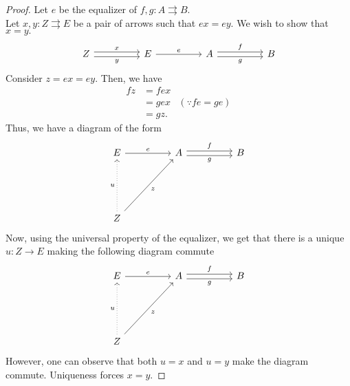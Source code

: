 \documentclass[11pt,leqno,landscape,semhelv]{seminar}
\theoremstyle{definition}
\numberwithin{joke}{section}
\numberwithin{thm}{section}
\numberwithin{equation}{section}
\newcommand{\tto}{\rightrightarrows}
\begin{document}
\begin{proof} 
  Let $e$ be the equalizer of $f, g:A\tto B.$\\
  Let $x, y:Z \tto E$ be a pair of arrows such that $ex = ey.$ We wish to show that $x = y.$
  \begin{equation*} 
    \begin{tikzcd}
      Z \arrow[rr, "x", shift left]\arrow[rr, "y"', shift right] &&
      E \arrow[rr, "e"] &&
      A \arrow[rr, "f", shift left]\arrow[rr, "g"', shift right] && B
    \end{tikzcd}
  \end{equation*}
  Consider $z = ex = ey.$ Then, we have
  \begin{align*} 
    fz &= fex\\
    &= gex & (\because fe = ge)\\
    &= gz.
  \end{align*}
  Thus, we have a diagram of the form
  \begin{equation*} 
    \begin{tikzcd}
    E \arrow[rr, "e"] &  & A \arrow[rr, "g"', shift right] \arrow[rr, "f", shift left]&&B\\
    &&&&\\&&&&\\
    Z \arrow[rruuu, "z"'] \arrow[uuu, "u", dotted] &&&&  
    \end{tikzcd}
  \end{equation*}
  Now, using the universal property of the equalizer, we get that there is a unique $u:Z \to E$ making the following diagram commute
  \begin{equation*} 
    \begin{tikzcd}
    E \arrow[rr, "e"] &  & A \arrow[rr, "g"', shift right] \arrow[rr, "f", shift left]&&B\\
    &&&&\\&&&&\\
    Z \arrow[rruuu, "z"'] \arrow[uuu, "u", dotted] &&&&  
    \end{tikzcd}
  \end{equation*}
  However, one can observe that both $u = x$ and $u = y$ make the diagram commute. Uniqueness forces $x = y.$
\end{proof}
\end{document}
